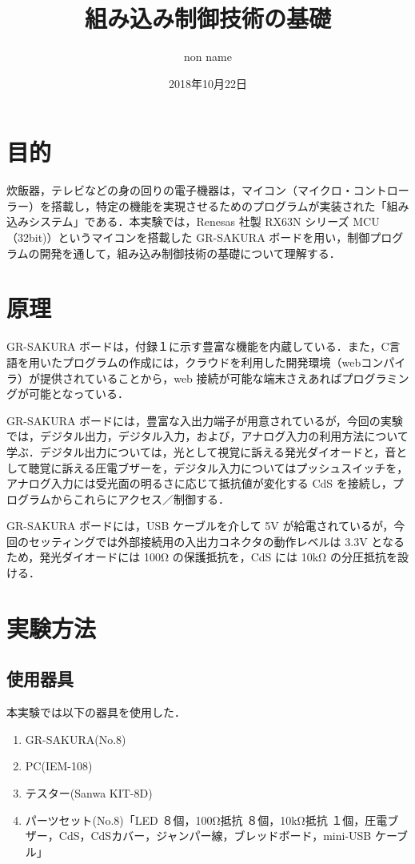 \documentclass {ujarticle}
\title {組み込み制御技術の基礎}
\author{non name}
\date {2018年10月22日}
\begin{document}
\maketitle
\newpage

\section{目的}
炊飯器，テレビなどの身の回りの電子機器は，マイコン（マイクロ・コントローラー）を搭載し，特定の機能を実現させるためのプログラムが実装された「組み込みシステム」である．本実験では，Renesas 社製 RX63N シリーズ MCU（32bit)）というマイコンを搭載した GR-SAKURA ボードを用い，制御プログラムの開発を通して，組み込み制御技術の基礎について理解する．

 \section{原理}
 GR-SAKURA ボードは，付録１に示す豊富な機能を内蔵している．また，C言語を用いたプログラムの作成には，クラウドを利用した開発環境（webコンパイラ）が提供されていることから，web 接続が可能な端末さえあればプログラミングが可能となっている．
 
 GR-SAKURA ボードには，豊富な入出力端子が用意されているが，今回の実験では，デジタル出力，デジタル入力，および，アナログ入力の利用方法について学ぶ．デジタル出力については，光として視覚に訴える発光ダイオードと，音として聴覚に訴える圧電ブザーを，デジタル入力についてはプッシュスイッチを，アナログ入力には受光面の明るさに応じて抵抗値が変化する CdS を接続し，プログラムからこれらにアクセス／制御する．
 
 GR-SAKURA ボードには，USB ケーブルを介して 5V が給電されているが，今回のセッティングでは外部接続用の入出力コネクタの動作レベルは 3.3V となるため，発光ダイオードには 100Ω の保護抵抗を，CdS には 10kΩ の分圧抵抗を設ける．
 
 \section{実験方法}
 \subsection{使用器具}
 本実験では以下の器具を使用した．
 \begin{enumerate}
 \item GR-SAKURA(No.8)
 \item PC(IEM-108)
 \item テスター(Sanwa KIT-8D)
 \item パーツセット(No.8)「LED ８個，100Ω抵抗 ８個，10kΩ抵抗 １個，圧電ブザー，CdS，CdSカバー，ジャンパー線，ブレッドボード，mini-USB ケーブル」
 \end{enumerate}
 
\end{document}
